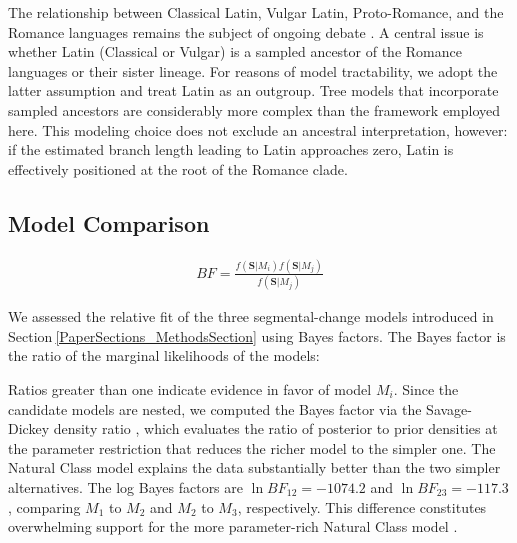 \documentclass[numsec,webpdf,modern,large,namedate]{oup-authoring-template}
\begin{document}
The relationship between Classical Latin, Vulgar Latin, Proto-Romance, and the Romance languages remains the subject of ongoing debate \citep{Posner1996,Harris2003,Chang2015,Heggarty2023,Goldstein2024}. A central issue is whether Latin (Classical or Vulgar) is a sampled ancestor of the Romance languages or their sister lineage. For reasons of model tractability, we adopt the latter assumption and treat Latin as an outgroup. Tree models that incorporate sampled ancestors are considerably more complex than the framework employed here. This modeling choice does not exclude an ancestral interpretation, however: if the estimated branch length leading to Latin approaches zero, Latin is effectively positioned at the root of the Romance clade. 

\subsection{Model Comparison}
\label{PaperSections_ModelComparison}
\begin{align}
\textit{BF}= \frac{f(\mathbf{S}\vert \textit{M}_i)f(\mathbf{S}\vert \textit{M}_j)}{f(\mathbf{S}\vert \textit{M}_j)}
\end{align}

We assessed the relative fit of the three segmental-change models introduced in Section$~$\ref{PaperSections_MethodsSection} using Bayes factors. The Bayes factor is the ratio of the marginal likelihoods of the models: 

Ratios greater than one indicate evidence in favor of model $\textit{M}_i$. Since the candidate models are nested, we computed the Bayes factor via the Savage-Dickey density ratio \citep{Dickey1971}, which evaluates the ratio of posterior to prior densities at the parameter restriction that reduces the richer model to the simpler one. The Natural Class model explains the data substantially better than the two simpler alternatives. The log Bayes factors are $\ln \textit{BF}_{12}= -1074.2$ and $\ln \textit{BF}_{23}= -117.3$, comparing $\textit{M}_1$ to $\textit{M}_2$ and $\textit{M}_2$ to $\textit{M}_3$, respectively. This difference constitutes overwhelming support for the more parameter-rich Natural Class model \citep{Jeffreys1939}. 
\end{document}
